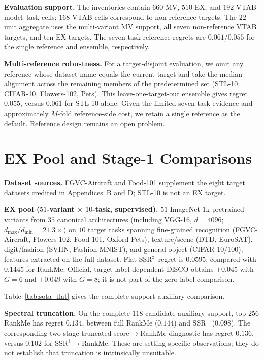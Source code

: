\documentclass{article}
\newcommand{\SSRdag}{\ensuremath{\mathrm{SSR}^{\ddagger}}\xspace}
\begin{document}
\textbf{Evaluation support.} The inventories contain $660$ MV, $510$ EX, and $192$ VTAB model--task cells; $168$ VTAB cells correspond to non-reference targets. The $22$-unit aggregate uses the multi-variant MV support, all seven non-reference VTAB targets, and ten EX targets. The seven-task reference regrets are $0.061/0.055$ for the single reference and ensemble, respectively.

\textbf{Multi-reference robustness.} For a target-disjoint evaluation, we omit any reference whose dataset name equals the current target and take the median alignment across the remaining members of the predetermined set (STL-10, CIFAR-10, Flowers-102, Pets). This leave-one-target-out ensemble gives regret $0.055$, versus $0.061$ for STL-10 alone. Given the limited seven-task evidence and approximately $M$-fold reference-side cost, we retain a single reference as the default. Reference design remains an open problem.

\section{EX Pool and Stage-1 Comparisons}
\label{app:extended}

\textbf{Dataset sources.} FGVC-Aircraft \citep{maji2013aircraft} and Food-101 \citep{bossard2014food} supplement the eight target datasets credited in Appendices~B and D; STL-10 is not an EX target.

\textbf{EX pool ($51$-variant $\times$ $10$-task, supervised).}  $51$ ImageNet-1k pretrained variants from $35$ canonical architectures (including VGG-16, $d{=}4096$; $d_{\max}/d_{\min}{=}21.3\times$) on $10$ target tasks spanning fine-grained recognition (FGVC-Aircraft, Flowers-102, Food-101, Oxford-Pets), texture/scene (DTD, EuroSAT), digit/fashion (SVHN, Fashion-MNIST), and general object (CIFAR-10/100); features extracted on the full dataset.  Flat-\SSRdag\ regret is $0.0595$, compared with $0.1445$ for RankMe.  Official, target-label-dependent DiSCO obtains $+0.045$ with $G{=}6$ and $+0.049$ with $G{=}8$; it is not part of the zero-label comparison.

Table~\ref{tab:sota_flat} gives the complete-support auxiliary comparison.

\textbf{Spectral truncation.} On the complete $118$-candidate auxiliary support, top-$256$ RankMe has regret $0.134$, between full RankMe ($0.144$) and \SSRdag\ ($0.098$). The corresponding two-stage truncated-score$\to$RankMe diagnostic has regret $0.136$, versus $0.102$ for \SSRdag$\to$RankMe. These are setting-specific observations; they do not establish that truncation is intrinsically unsuitable.
\end{document}

